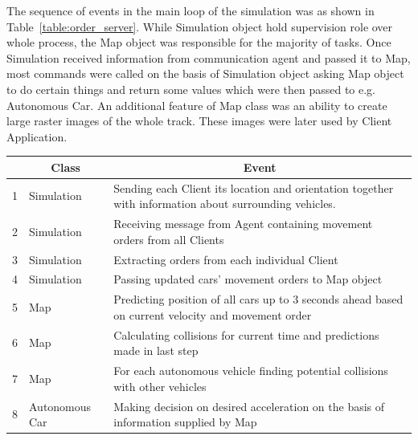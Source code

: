 \documentclass[11pt,english]{article}
\begin{document}
The sequence of events in the main loop of the simulation was as shown in Table~\ref{table:order_server}. While Simulation object hold supervision role over whole process, the Map object was responsible for the majority of tasks. Once Simulation received information from communication agent and passed it to Map, most commands were called on the basis of Simulation object asking Map object to do certain things and return some values which were then passed to e.g. Autonomous Car. An additional feature of Map class was an ability to create large raster images of the whole track. These images were later used by Client Application.


\begin{table}[]
\centering
\begin{tabular}{|l|p{2cm}|p{11cm}|}
\hline
\textbf{} & \multicolumn{1}{c|}{\textbf{Class}} & \multicolumn{1}{c|}{\textbf{Event}}                                                                    \\ \hline
1         & Simulation                          & Sending each Client its location and orientation together with information about surrounding vehicles. \\ \hline
2         & Simulation                          & Receiving message from Agent containing movement orders from all Clients                                \\ \hline
3         & Simulation                          & Extracting orders from each individual Client                                                          \\ \hline
4         & Simulation                          & Passing updated cars' movement orders to Map object                                                    \\ \hline
5         & Map                                 & Predicting position of all cars up to 3 seconds ahead based on current velocity and movement order     \\ \hline
6         & Map                                 & Calculating collisions for current time and predictions made in last step                              \\ \hline
7         & Map                                 & For each autonomous vehicle finding potential collisions with other vehicles                           \\ \hline
8         & Autonomous Car                      & Making decision on desired acceleration on the basis of information supplied by Map                    \\ \hline

\end{tabular}
\end{table}
\end{document}
